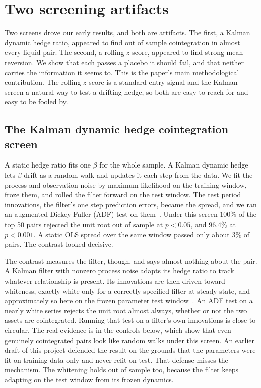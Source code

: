 \documentclass[11pt]{article}
\begin{document}
\section{Two screening artifacts}
\label{sec:artifacts}

Two screens drove our early results, and both are artifacts. The first, a Kalman dynamic
hedge ratio, appeared to find out of sample cointegration in almost every liquid pair. The
second, a rolling $z$ score, appeared to find strong mean reversion. We show that each passes
a placebo it should fail, and that neither carries the information it seems to. This is the
paper's main methodological contribution. The rolling $z$ score is a standard entry signal and the
Kalman screen a natural way to test a drifting hedge, so both are easy to reach for and easy to be
fooled by.

\subsection{The Kalman dynamic hedge cointegration screen}
\label{sec:kalman}

A static hedge ratio fits one $\beta$ for the whole sample. A Kalman dynamic hedge lets
$\beta$ drift as a random walk and updates it each step from the data. We fit the process and
observation noise by maximum likelihood on the training window, froze them, and rolled the
filter forward on the test window. The test period innovations, the filter's one step
prediction errors, became the spread, and we ran an augmented Dickey-Fuller (ADF) test on
them~\cite{saiddickey1984}. Under this screen $100\%$ of the top 50 pairs rejected the unit root out of sample at
$p<0.05$, and $96.4\%$ at $p<0.001$. A static OLS spread over the same window passed only
about $3\%$ of pairs. The contrast looked decisive.

The contrast measures the filter, though, and says almost nothing about the pair. A Kalman filter with nonzero process noise
adapts its hedge ratio to track whatever relationship is present. Its innovations are then
driven toward whiteness, exactly white only for a correctly specified filter at steady state,
and approximately so here on the frozen parameter test window~\cite{harvey1989structural}. An ADF test on a nearly white
series rejects the unit root almost always, whether or not the two assets are cointegrated. Running
that test on a filter's own innovations is close to circular. The real evidence is in the controls
below, which show that even genuinely cointegrated pairs look like random walks under this screen.
An earlier draft of this project defended the result on the grounds that the
parameters were fit on training data only and never refit on test. That defense misses the
mechanism. The whitening holds out of sample too, because the filter keeps adapting on the
test window from its frozen dynamics.
\end{document}

